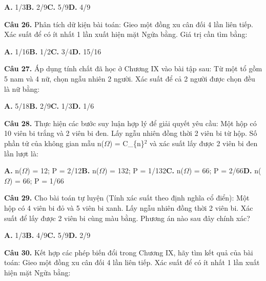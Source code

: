 \documentclass[11pt,a4paper]{article}
\begin{document}
\hspace*{1.5em}\textbf{A.} 1/3\quad\quad \textbf{B.} 2/9\quad\quad \textbf{C.} 5/9\quad\quad \textbf{D.} 4/9\par\vspace{2pt}
\textbf{\color{primary} Câu 26.} Phân tích dữ kiện bài toán: Gieo một đồng xu cân đối 4 lần liên tiếp. Xác suất để có ít nhất 1 lần xuất hiện mặt Ngửa bằng. Giá trị cần tìm bằng:\par
\hspace*{1.5em}\textbf{A.} 1/16\quad\quad \textbf{B.} 1/2\quad\quad \textbf{C.} 3/4\quad\quad \textbf{D.} 15/16\par\vspace{2pt}
\textbf{\color{primary} Câu 27.} Áp dụng tính chất đã học ở Chương IX vào bài tập sau: Từ một tổ gồm 5 nam và 4 nữ, chọn ngẫu nhiên 2 người. Xác suất để cả 2 người được chọn đều là nữ bằng:\par
\hspace*{1.5em}\textbf{A.} 5/18\quad\quad \textbf{B.} 2/9\quad\quad \textbf{C.} 1/3\quad\quad \textbf{D.} 1/6\par\vspace{2pt}
\textbf{\color{primary} Câu 28.} Thực hiện các bước suy luận hợp lý để giải quyết yêu cầu: Một hộp có 10 viên bi trắng và 2 viên bi đen. Lấy ngẫu nhiên đồng thời 2 viên bi từ hộp. Số phần tử của không gian mẫu n($\Omega$) = C\_\{n\}$^{2}$ và xác suất lấy được 2 viên bi đen lần lượt là:\par
\hspace*{1.5em}\textbf{A.} n($\Omega$) = 12; P = 2/12\quad\quad \textbf{B.} n($\Omega$) = 132; P = 1/132\quad\quad \textbf{C.} n($\Omega$) = 66; P = 2/66\quad\quad \textbf{D.} n($\Omega$) = 66; P = 1/66\par\vspace{2pt}
\textbf{\color{primary} Câu 29.} Cho bài toán tự luyện (Tính xác suất theo định nghĩa cổ điển): Một hộp có 4 viên bi đỏ và 5 viên bi xanh. Lấy ngẫu nhiên đồng thời 2 viên bi. Xác suất để lấy được 2 viên bi cùng màu bằng. Phương án nào sau đây chính xác?\par
\hspace*{1.5em}\textbf{A.} 1/3\quad\quad \textbf{B.} 4/9\quad\quad \textbf{C.} 5/9\quad\quad \textbf{D.} 2/9\par\vspace{2pt}
\textbf{\color{primary} Câu 30.} Kết hợp các phép biến đổi trong Chương IX, hãy tìm kết quả của bài toán: Gieo một đồng xu cân đối 4 lần liên tiếp. Xác suất để có ít nhất 1 lần xuất hiện mặt Ngửa bằng:\par
\end{document}
